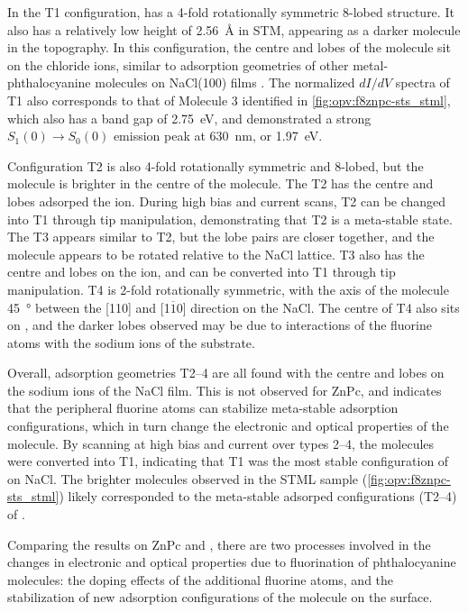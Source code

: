In the T1 configuration,  has a 4-fold rotationally symmetric 8-lobed structure. It also has a relatively low height of \SI{2.56}{\angstrom} in STM, appearing as a darker molecule in the topography. In this configuration, the centre and lobes of the molecule sit on the chloride ions, similar to adsorption geometries of other metal-phthalocyanine molecules on NaCl(100) films \citep{Miwa2016}. The normalized $dI/dV$ spectra of T1 also corresponds to that of Molecule 3 identified in \autoref{fig:opv:f8znpc-sts_stml}, which also has a band gap of \SI{2.75}{eV}, and demonstrated a strong $S_1(0) \rightarrow S_0(0)$ emission peak at \SI{630}{nm}, or \SI{1.97}{eV}. 

Configuration T2 is also 4-fold rotationally symmetric and 8-lobed, but the molecule is brighter in the centre of the molecule. The T2  has the centre and lobes adsorped the  ion. During high bias and current scans, T2  can be changed into T1 through tip manipulation, demonstrating that T2 is a meta-stable state. The T3  appears similar to T2, but the lobe pairs are closer together, and the molecule appears to be rotated relative to the NaCl lattice. T3 also has the centre and lobes on the  ion, and can be converted into T1 through tip manipulation. T4 is 2-fold rotationally symmetric, with the axis of the molecule \SI{45}{\degree} between the [110] and [1$\overline{1}$0] direction on the NaCl. The centre of T4 also sits on , and the darker lobes observed may be due to interactions of the fluorine atoms with the sodium ions of the substrate.

Overall, adsorption geometries T2--4 are all found with the centre and lobes on the sodium ions of the NaCl film. This is not observed for ZnPc, and indicates that the peripheral fluorine atoms can stabilize meta-stable adsorption configurations, which in turn change the electronic and optical properties of the molecule. By scanning at high bias and current over types 2--4, the molecules were converted into T1, indicating that T1 was the most stable configuration of  on NaCl. The brighter molecules observed in the \ac{STML} sample (\autoref{fig:opv:f8znpc-sts_stml}) likely corresponded to the meta-stable  adsorped configurations (T2--4) of . 

Comparing the results on ZnPc and , there are two processes involved in the changes in electronic and optical properties due to fluorination of phthalocyanine molecules: the doping effects of the additional fluorine atoms, and the stabilization of new adsorption configurations of the molecule on the surface.

